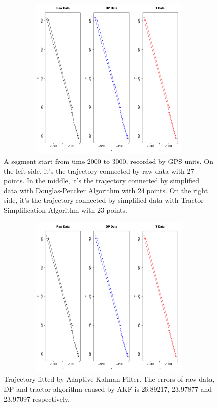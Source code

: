 \begin{figure}
\centering
\includegraphics[width=15cm,height=8cm]{Chapters/06Spinoff/plot/3p1.pdf}
\caption{A segment start from time 2000 to 3000, recorded by GPS units. On the left side, it's the trajectory connected by raw data with 27 points. In the middle, it's the trajectory connected by simplified data with Douglas-Peucker Algorithm with 24 points. On the right side, it's the trajectory connected by simplified data with Tractor Simplification Algorithm with 23 points.}
\end{figure}

\begin{figure}
\centering
\includegraphics[width=15cm,height=8cm]{Chapters/06Spinoff/plot/km3p}
\caption{Trajectory fitted by Adaptive Kalman Filter. The errors of raw data, DP and tractor algorithm caused by AKF is  26.89217, 23.97877 and 23.97097 respectively.}
\end{figure}
